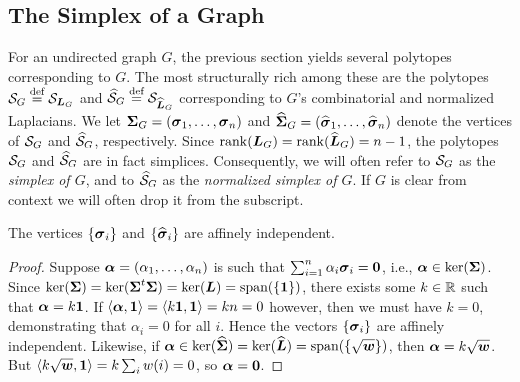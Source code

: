 \subsection{The Simplex of a Graph}
\label{sec:graph_to_simplex}
For an undirected graph $G$, the previous section yields several polytopes corresponding to $G$. The most structurally rich among these are the polytopes $\mathcal{S}_G\overset{\text{def}}{=} \mathcal{S}_{\vb*{L}_G}$ and $\widehat{\mathcal{S}}_G\overset{\text{def}}{=} \mathcal{S}_{\widehat{\vb*{L}}_G}$ corresponding to $G$'s combinatorial and normalized Laplacians.  We let $\boldsymbol{\Sigma}_G=(\vb*{\sigma}_1,\dots,\vb*{\sigma}_n)$ and $\widehat{\boldsymbol{\Sigma}}_G=(\widehat{\vb*{\sigma}}_1,\dots,\widehat{\vb*{\sigma}}_n)$ denote the vertices of $\mathcal{S}_G$ and $\widehat{\mathcal{S}}_G$, respectively. Since $\rank(\vb*{L}_G)=\rank(\widehat{\vb*{L}}_G)=n-1$, the polytopes $\mathcal{S}_G$ and $\widehat{\mathcal{S}}_G$ are in fact simplices. Consequently, we will often refer to $\mathcal{S}_G$ as the \emph{simplex of $G$}, and to $\widehat{\mathcal{S}}_G$ as the \emph{normalized simplex of $G$}. If $G$ is clear from context we will often drop it from the subscript. 

\begin{lemma}
\label{lem:sv_affine_indep}
The vertices $\{\vb*{\sigma}_i\}$  and $\{\widehat{\vb*{\sigma}}_i\}$ are affinely independent. 
\end{lemma}
\begin{proof}
Suppose $\vb*{\alpha} = (\alpha_1,\dots,\alpha_n)$ is such that 
$\sum_{i=1}^n \alpha_i\vb*{\sigma}_i = \vb{0}$, i.e., $\vb*{\alpha}\in\ker(\boldsymbol{\Sigma})$. Since $\ker(\boldsymbol{\Sigma})=\ker(\boldsymbol{\Sigma}^t\boldsymbol{\Sigma})=\ker(\vb*{L})=\textnormal{span}(\{\vb{1}\})$, there exists some $k\in \mathbb{R}$ such that $\vb*{\alpha}=k\vb{1}$. If $\langle \vb*{\alpha},\vb{1}\rangle = \langle k\vb{1},\vb{1}\rangle=kn=0$ however, then we must have $k=0$, demonstrating that $\alpha_i=0$ for all $i$. Hence the vectors $\{\vb*{\sigma}_i\}$ are affinely independent. Likewise, if $\vb*{\alpha}\in\ker(\widehat{\boldsymbol{\Sigma}})=\ker(\widehat{\vb*{L}})=\textnormal{span}(\{\sqrt{\vb*{w}}\})$, then $\vb*{\alpha}=k\sqrt{\vb*{w}}$. But $\langle k\sqrt{\vb*{w}},\vb{1}\rangle = k\sum_{i}w(i)=0$, so $\vb*{\alpha}=\vb{0}$. 
\end{proof}

